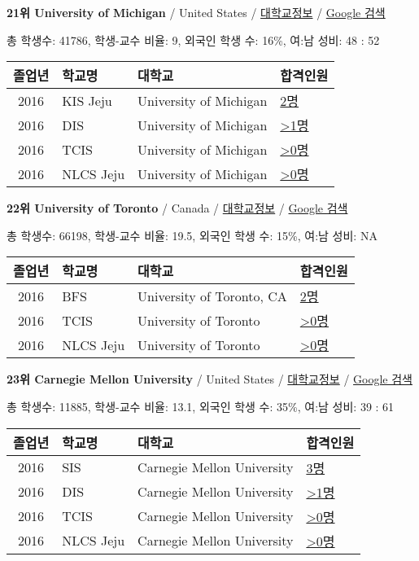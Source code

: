 \documentclass[13pt,]{article}
\begin{document}
\textbf{21위 University of Michigan} / United States /
\href{https://www.timeshighereducation.com/world-university-rankings/university-of-michigan?ranking-dataset=589595}{대학교정보}
/ \href{http://www.google.com/search?q=University+of+Michigan}{Google
검색}

총 학생수: 41786, 학생-교수 비율: 9, 외국인 학생 수: 16\%, 여:남 성비:
48 : 52

\begin{longtable}[]{@{}clll@{}}
\toprule
졸업년 & 학교명 & 대학교 & 합격인원\tabularnewline
\midrule
\endhead
2016 & KIS Jeju & University of Michigan &
\href{http://cafe.naver.com/assarabia/11596}{2명}\tabularnewline
2016 & DIS & University of Michigan &
\href{http://cafe.naver.com/assarabia/11591}{\textgreater{}1명}\tabularnewline
2016 & TCIS & University of Michigan &
\href{http://cafe.naver.com/assarabia/11598}{\textgreater{}0명}\tabularnewline
2016 & NLCS Jeju & University of Michigan &
\href{http://cafe.naver.com/assarabia/11592}{\textgreater{}0명}\tabularnewline
\bottomrule
\end{longtable}

\textbf{22위 University of Toronto} / Canada /
\href{https://www.timeshighereducation.com/world-university-rankings/university-of-toronto?ranking-dataset=589595}{대학교정보}
/ \href{http://www.google.com/search?q=University+of+Toronto}{Google
검색}

총 학생수: 66198, 학생-교수 비율: 19.5, 외국인 학생 수: 15\%, 여:남
성비: NA

\begin{longtable}[]{@{}clll@{}}
\toprule
졸업년 & 학교명 & 대학교 & 합격인원\tabularnewline
\midrule
\endhead
2016 & BFS & University of Toronto, CA &
\href{http://cafe.naver.com/assarabia/11597}{2명}\tabularnewline
2016 & TCIS & University of Toronto &
\href{http://cafe.naver.com/assarabia/11598}{\textgreater{}0명}\tabularnewline
2016 & NLCS Jeju & University of Toronto &
\href{http://cafe.naver.com/assarabia/11592}{\textgreater{}0명}\tabularnewline
\bottomrule
\end{longtable}

\textbf{23위 Carnegie Mellon University} / United States /
\href{https://www.timeshighereducation.com/world-university-rankings/carnegie-mellon-university?ranking-dataset=589595}{대학교정보}
/
\href{http://www.google.com/search?q=Carnegie+Mellon+University}{Google
검색}

총 학생수: 11885, 학생-교수 비율: 13.1, 외국인 학생 수: 35\%, 여:남
성비: 39 : 61

\begin{longtable}[]{@{}clll@{}}
\toprule
졸업년 & 학교명 & 대학교 & 합격인원\tabularnewline
\midrule
\endhead
2016 & SIS & Carnegie Mellon University &
\href{http://cafe.naver.com/assarabia/11589}{3명}\tabularnewline
2016 & DIS & Carnegie Mellon University &
\href{http://cafe.naver.com/assarabia/11591}{\textgreater{}1명}\tabularnewline
2016 & TCIS & Carnegie Mellon University &
\href{http://cafe.naver.com/assarabia/11598}{\textgreater{}0명}\tabularnewline
2016 & NLCS Jeju & Carnegie Mellon University &
\href{http://cafe.naver.com/assarabia/11592}{\textgreater{}0명}\tabularnewline
\bottomrule
\end{longtable}
\end{document}
